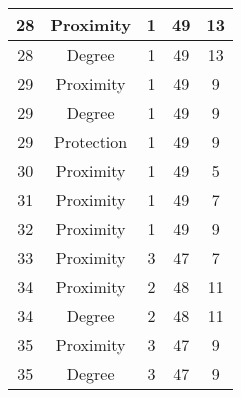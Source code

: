 \documentclass[results.tex]{subfiles}
\begin{document}
\begin{center}
\begin{tabular}{| c || c | c | c | c |}
            \hline
            28                      & Proximity                    & 1                      & 49                      & 13                   \\
            \hline
            28                      & Degree                       & 1                      & 49                      & 13                   \\
            \hline
            29                      & Proximity                    & 1                      & 49                      & 9                    \\
            \hline
            29                      & Degree                       & 1                      & 49                      & 9                    \\
            \hline
            29                      & Protection                   & 1                      & 49                      & 9                    \\
            \hline
            30                      & Proximity                    & 1                      & 49                      & 5                    \\
            \hline
            31                      & Proximity                    & 1                      & 49                      & 7                    \\
            \hline
            32                      & Proximity                    & 1                      & 49                      & 9                    \\
            \hline
            33                      & Proximity                    & 3                      & 47                      & 7                    \\
            \hline
            34                      & Proximity                    & 2                      & 48                      & 11                   \\
            \hline
            34                      & Degree                       & 2                      & 48                      & 11                   \\
            \hline
            35                      & Proximity                    & 3                      & 47                      & 9                    \\
            \hline
            35                      & Degree                       & 3                      & 47                      & 9                    \\

\end{tabular}
\end{center}
\end{document}
